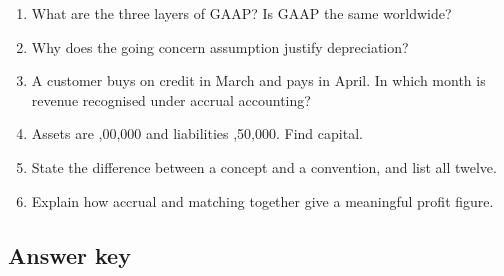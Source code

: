 \documentclass[11pt,a4paper]{article}
\newcommand{\Rs}{\ifmmode\text{\rsfont ₹}\else{\rsfont ₹}\fi}
\begin{document}
\begin{enumerate}
  \item What are the three layers of GAAP? Is GAAP the same worldwide?
  \item Why does the going concern assumption justify depreciation?
  \item A customer buys on credit in March and pays in April. In which month is revenue recognised under accrual accounting?
  \item Assets are \Rs 12,00,000 and liabilities \Rs 4,50,000. Find capital.
  \item State the difference between a concept and a convention, and list all twelve.
  \item Explain how accrual and matching together give a meaningful profit figure.
\end{enumerate}

\subsection{Answer key}
\end{document}
